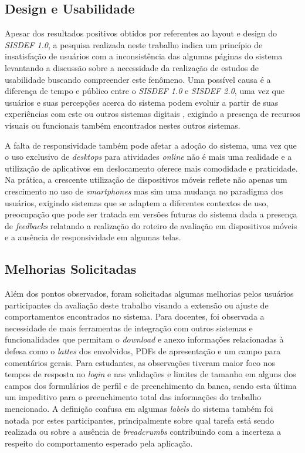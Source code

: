 \documentclass[nonacm, sigconf]{acmart}
\begin{document}
\subsection{Design e Usabilidade}

Apesar dos resultados positivos obtidos por \cite{gabrieltcc} referentes ao layout e design do \textit{SISDEF 1.0}, a pesquisa realizada neste trabalho indica um princípio de insatisfação de usuários com a inconsistência das algumas páginas do sistema levantando a discussão sobre a necessidade da realização de estudos de usabilidade buscando compreender este fenômeno. Uma possível causa é a diferença de tempo e público entre o \textit{SISDEF 1.0} e \textit{SISDEF 2.0}, uma vez que usuários e suas percepções acerca do sistema podem evoluir a partir de suas experiências com este ou outros sistemas digitais \cite{nielsen1994usability}, exigindo a presença de recursos visuais ou funcionais também encontrados nestes outros sistemas.

A falta de responsividade também pode afetar a adoção do sistema, uma vez que o uso exclusivo de \textit{desktops} para atividades \textit{online} não é mais uma realidade \cite{ticbr2023} e a utilização de aplicativos em deslocamento oferece mais comodidade e praticidade. Na prática, a crescente utilização de dispositivos móveis reflete não apenas um crescimento no uso de \textit{smartphones} mas sim uma mudança no paradigma dos usuários, exigindo sistemas que se adaptem a diferentes contextos de uso, preocupação que pode ser tratada em versões futuras do sistema dada a presença de \textit{feedbacks} relatando a realização do roteiro de avaliação em dispositivos móveis e a ausência de responsividade em algumas telas.

\subsection{Melhorias Solicitadas}

Além dos pontos observados, foram solicitadas algumas melhorias pelos usuários participantes da avaliação deste trabalho visando a extensão ou ajuste de comportamentos encontrados no sistema. Para docentes, foi observada a necessidade de mais ferramentas de integração com outros sistemas \cite{katarina2015} e funcionalidades que permitam o \textit{download} e anexo informações relacionadas à defesa como o \textit{lattes} dos envolvidos, PDFs de apresentação e um campo para comentários gerais. Para estudantes, as observações tiveram maior foco nos tempos de resposta no \textit{login} e nas validações e limites de tamanho em alguns dos campos dos formulários de perfil e de preenchimento da banca, sendo esta última um impeditivo para o preenchimento total das informações do trabalho mencionado. A definição confusa em algumas \textit{labels} do sistema também foi notada por estes participantes, principalmente sobre qual tarefa está sendo realizada ou sobre a ausência de \textit{breadcrumbs} contribuindo com a incerteza a respeito do comportamento esperado pela aplicação.
\end{document}
